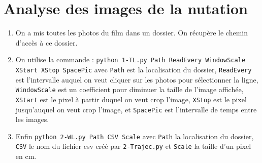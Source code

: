 \documentclass[10pt,a4paper]{article}
\begin{document}
\section{Analyse des images de la nutation\label{anaNut}}
\begin{enumerate}
    \item On a mis toutes les photos du film dans un dossier. On récupère le chemin d'accès à ce dossier.
    \item On utilise la commande : \texttt{python 1-TL.py Path ReadEvery WindowScale XStart XStop SpacePic} avec \texttt{Path} est la localisation du dossier, \texttt{ReadEvery} est l'intervalle auquel on veut cliquer sur les photos pour sélectionner la ligne, \texttt{WindowScale} est un coefficient pour diminuer la taille de l'image affichée, \texttt{XStart} est le pixel à partir duquel on veut crop l'image, \texttt{XStop} est le pixel jusqu'auquel on veut crop l'image, et \texttt{SpacePic} est l'intervalle de temps entre les images.
    \item Enfin \texttt{python 2-WL.py Path CSV Scale} avec \texttt{Path} la localisation du dossier, \texttt{CSV} le nom du fichier csv créé par \texttt{2-Trajec.py} et \texttt{Scale} la taille d'un pixel en cm.
\end{enumerate}
\end{document}
